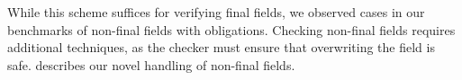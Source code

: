   While this scheme suffices for verifying final fields, we observed cases
  in our benchmarks of non-final fields with \MustCall obligations.  Checking
  non-final fields requires additional techniques, as the checker must ensure
  that overwriting the field is safe.
   describes our novel handling of non-final fields.



